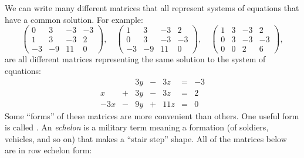 \documentclass{ximera}
\begin{document}
We can write many different matrices that all represent systems
of equations that have a common solution. For example:
\[
\begin{pmatrix}
 0 &   3 & -3 & -3 \\
  1 &   3 & -3 & 2  \\
  -3& -9  & 11 & 0
\end{pmatrix},
\quad
\begin{pmatrix}
  1 &   3 & -3 & 2  \\
  0 &   3 & -3 & -3 \\
  -3& -9  & 11 & 0
\end{pmatrix},
\quad
\begin{pmatrix}
  1 &   3 & -3 & 2  \\
  0 &   3 & -3 & -3 \\
  0& 0  & 2 & 6
\end{pmatrix},
\]
are all different matrices representing the same solution to the
system of equations:
\[
  \begin{array}{ccccccc}
    & & 3y &-& 3z &=& -3 \\
    x& +&3y&-&3z&=&2\\
    -3x& -&9y&+&11z&=&0
  \end{array}
\]
Some ``forms'' of these matrices are more convenient than others. One
useful form is called .
An \textit{echelon} is a military term meaning a formation
(of soldiers, vehicles, and so on) that makes a ``stair step''
shape. All of the matrices below are in row echelon form:
\end{document}
